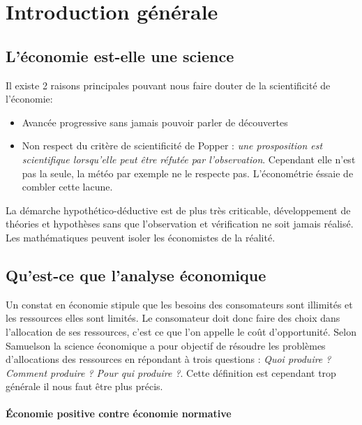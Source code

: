
  
\section{Introduction générale} %
\label{prt:introduction_generale}

\subsection{L'économie est-elle une science} %
\label{sec:l_economie_est_elle_une_science}
Il existe 2 raisons principales pouvant nous faire douter de la scientificité de l'économie:

\begin{itemize}[label=]
	\item Avancée progressive sans jamais pouvoir parler de découvertes	
	\item Non respect du critère de scientificité de Popper : \emph{une prosposition est scientifique lorsqu'elle peut être réfutée par l'observation}. Cependant elle n'est pas la seule, la météo par exemple ne le respecte pas. L'économétrie éssaie de combler cette lacune.
\end{itemize}

La démarche hypothético-déductive est de plus très criticable, développement de théories et hypothèses sans que l'observation et vérification ne soit jamais réalisé. Les mathématiques peuvent isoler les économistes de la réalité.


\subsection{Qu'est-ce que l'analyse économique} %
\label{sec:qu_est_ce_que_l_analyse_economique}

Un constat en économie stipule que les besoins des consomateurs sont illimités et les ressources elles sont limités. Le consomateur doit donc faire des choix dans l'allocation de ses ressources, c'est ce que l'on appelle le coût d'opportunité. Selon Samuelson la science économique a pour objectif de résoudre les problèmes d'allocations des ressources en répondant à trois questions : \emph{Quoi produire ? Comment produire ? Pour qui produire ?}. Cette définition est cependant trop générale il nous faut être plus précis. 

\paragraph{Économie positive contre économie normative} %
\label{par:economie_positive_contre_economie_normative}


